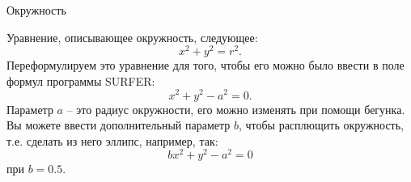 \documentclass[ru]{./../../common/SurferDesc}%
\begin{document}
\footnotesize
%


\begin{surferPage}
  \begin{surferTitle}Окружность\end{surferTitle}
   \begin{surferText}
   
Уравнение, описывающее окружность, следующее:
\[x^2+y^2=r^2.\]
Переформулируем это уравнение для того, чтобы его можно было ввести в поле формул программы SURFER:
\[x^2+y^2-a^2=0.\]
Параметр $a$ – это радиус окружности, его можно изменять при помощи бегунка. Вы можете ввести дополнительный параметр $b$, чтобы расплющить окружность, т.е. сделать из него эллипс, например, так:
\[bx^2+y^2-a^2=0\] при $b=0.5$.

     \end{surferText}
\end{surferPage}
\end{document}
